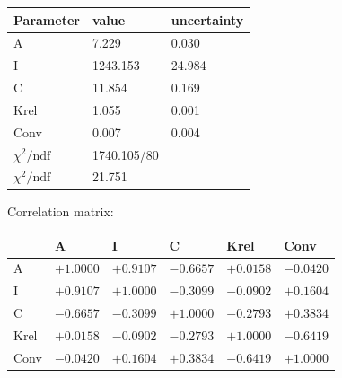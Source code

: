 \begin{tabular}{l|ll}
Parameter & value & uncertainty \\ \hline
 A & 7.229 & 0.030 \\ 
 I & 1243.153 & 24.984 \\ 
 C & 11.854 & 0.169 \\ 
 Krel & 1.055 & 0.001 \\ 
 Conv & 0.007 & 0.004 \\ 
 \hline
 $\chi^2/\mathrm{ndf}$ & 1740.105/80 & \\
 $\chi^2/\mathrm{ndf}$ & 21.751 & \\
\end{tabular}

Correlation matrix:

\begin{tabular}{l|lllll} 
 & A & I & C & Krel & Conv \\ \hline
 A & $+1.0000$ & $+0.9107$ & $-0.6657$ & $+0.0158$ & $-0.0420$ \\ 
 I & $+0.9107$ & $+1.0000$ & $-0.3099$ & $-0.0902$ & $+0.1604$ \\ 
 C & $-0.6657$ & $-0.3099$ & $+1.0000$ & $-0.2793$ & $+0.3834$ \\ 
 Krel & $+0.0158$ & $-0.0902$ & $-0.2793$ & $+1.0000$ & $-0.6419$ \\ 
 Conv & $-0.0420$ & $+0.1604$ & $+0.3834$ & $-0.6419$ & $+1.0000$ \\ 
\end{tabular}
